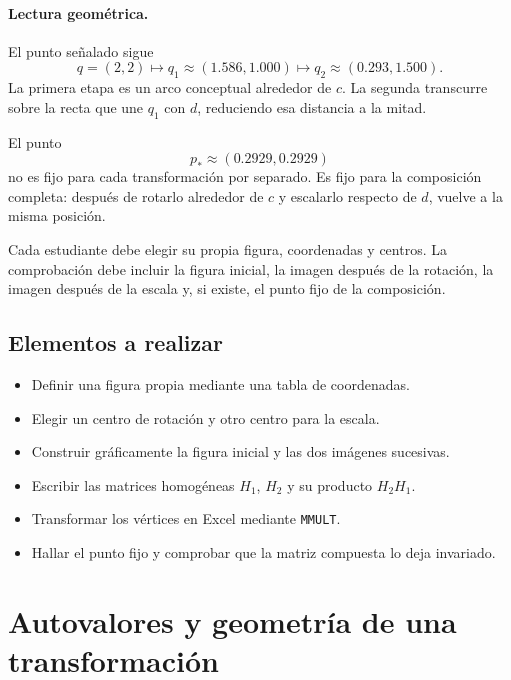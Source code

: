 \paragraph{Lectura geométrica.}
El punto señalado sigue
\[
  q=(2,2)
  \longmapsto
  q_1\approx(1.586,1.000)
  \longmapsto
  q_2\approx(0.293,1.500).
\]
La primera etapa es un arco conceptual alrededor de \(c\). La segunda transcurre sobre la
recta que une \(q_1\) con \(d\), reduciendo esa distancia a la mitad.

\begin{resultado}
El punto
\[
  p_\ast\approx(0.2929,0.2929)
\]
no es fijo para cada transformación por separado. Es fijo para la composición completa:
después de rotarlo alrededor de \(c\) y escalarlo respecto de \(d\), vuelve a la misma
posición.
\end{resultado}

\begin{idea}
Cada estudiante debe elegir su propia figura, coordenadas y centros. La comprobación debe
incluir la figura inicial, la imagen después de la rotación, la imagen después de la escala
y, si existe, el punto fijo de la composición.
\end{idea}

\subsection{Elementos a realizar}

\begin{itemize}[label=\(\square\)]
  \item Definir una figura propia mediante una tabla de coordenadas.
  \item Elegir un centro de rotación y otro centro para la escala.
  \item Construir gráficamente la figura inicial y las dos imágenes sucesivas.
  \item Escribir las matrices homogéneas \(H_1\), \(H_2\) y su producto \(H_2H_1\).
  \item Transformar los vértices en Excel mediante \texttt{MMULT}.
  \item Hallar el punto fijo y comprobar que la matriz compuesta lo deja invariado.
\end{itemize}

\section{Autovalores y geometría de una transformación}\label{sec:autovalores-geom}

